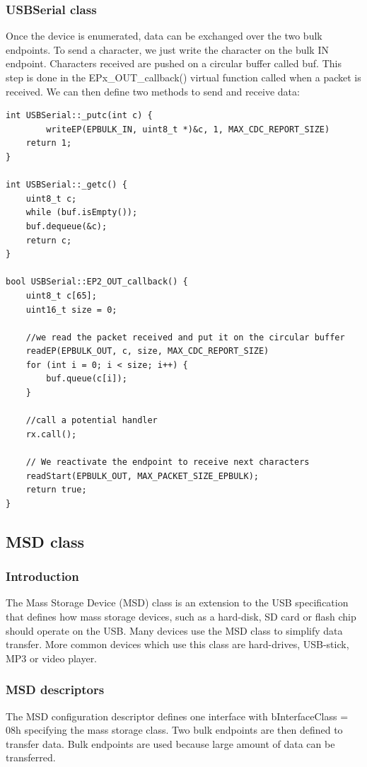 \documentclass[pdftex,10pt,a4paper]{report}
\begin{document}
\subsubsection{USBSerial class}
Once the device is enumerated, data can be exchanged over the two bulk endpoints. To send a character, we just write the character on the bulk IN endpoint. Characters received are pushed on a circular buffer called buf. This step is done in the EPx\_OUT\_callback() virtual function called when a packet is received. We can then define two methods to send and receive data:

\begin{lstlisting}[label=USBSerial: putc and getc,caption=USBSerial: putc and getc]
int USBSerial::_putc(int c) {
		writeEP(EPBULK_IN, uint8_t *)&c, 1, MAX_CDC_REPORT_SIZE)
    return 1;
}

int USBSerial::_getc() {
    uint8_t c;
    while (buf.isEmpty());
    buf.dequeue(&c);
    return c;
}

bool USBSerial::EP2_OUT_callback() {
    uint8_t c[65];
    uint16_t size = 0;

    //we read the packet received and put it on the circular buffer
    readEP(EPBULK_OUT, c, size, MAX_CDC_REPORT_SIZE)
    for (int i = 0; i < size; i++) {
        buf.queue(c[i]);
    }

    //call a potential handler
    rx.call();

    // We reactivate the endpoint to receive next characters
    readStart(EPBULK_OUT, MAX_PACKET_SIZE_EPBULK);
    return true;
}
\end{lstlisting}




\subsection{MSD class}
\subsubsection{Introduction}
The Mass Storage Device (MSD) class is an extension to the USB specification that defines
how mass storage devices, such as a hard-disk, SD card or flash chip should operate on the USB.
Many devices use the MSD class to simplify data transfer. More common devices which use this class are hard-drives, USB-stick, MP3 or video player.

\subsubsection{MSD descriptors}
The MSD configuration descriptor defines one interface with bInterfaceClass = 08h specifying the mass storage class. Two bulk endpoints are then defined to transfer data. Bulk endpoints are used because large amount of data can be transferred.
\end{document}
